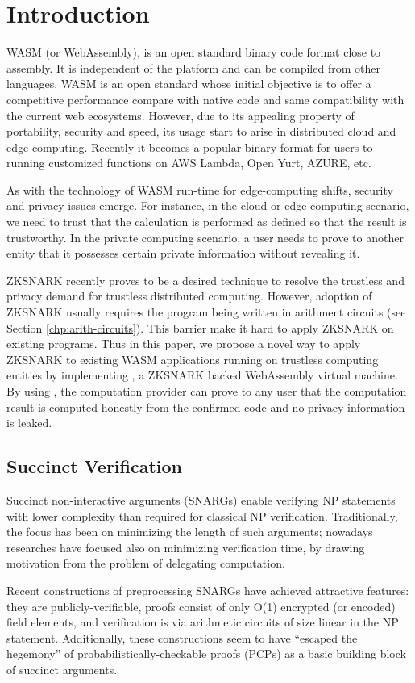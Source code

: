 \section{Introduction}
WASM (or WebAssembly), is an open standard binary code format close to assembly. It is independent of the platform and can be compiled from other languages. WASM is an open standard whose initial objective is to offer a competitive performance compare with native code and same compatibility with the current web ecosystems. However, due to its appealing property of portability, security and speed, its usage start to arise in distributed cloud and edge computing. Recently it becomes a popular binary format for users to running customized functions on AWS Lambda, Open Yurt, AZURE, etc.

As with the technology of WASM run-time for edge-computing shifts, security and privacy issues emerge. For instance, in the cloud or edge computing scenario, we need to trust that the calculation is performed as defined so that the result is trustworthy. In the private computing scenario, a user needs to prove to another entity that it possesses certain private information without revealing it.

ZKSNARK recently proves to be a desired technique to resolve the trustless and privacy demand for trustless distributed computing. However, adoption of ZKSNARK usually requires the program being written in arithment circuits (see Section \ref{chp:arith-circuits}). This barrier make it hard to apply ZKSNARK on existing programs. Thus in this paper, we propose a novel way to apply ZKSNARK to existing WASM applications running on trustless computing entities by implementing \zkwasm, a ZKSNARK backed WebAssembly virtual machine. By using \zkwasm, the computation provider can prove to any user that the computation result is computed honestly from the confirmed code and no privacy information is leaked.

\subsection{Succinct Verification}
Succinct non-interactive arguments (SNARGs) enable verifying NP statements with lower complexity than required for classical NP verification. Traditionally, the focus has been on minimizing the length of such arguments; nowadays researches have focused also on minimizing verification time, by drawing motivation from the problem of delegating computation.

Recent constructions of preprocessing SNARGs have achieved attractive features: they are publicly-verifiable, proofs consist of only O(1) encrypted (or encoded) field elements, and verification is via arithmetic circuits of size linear in the NP statement. Additionally, these constructions seem to have “escaped the hegemony” of probabilistically-checkable proofs (PCPs) as a basic building block of succinct arguments.


